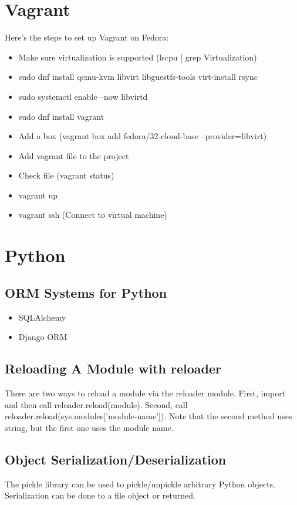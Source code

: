 \documentclass{article}
\begin{document}
\section{Vagrant}

Here's the steps to set up Vagrant on Fedora:
\begin{itemize}
\item Make sure virtualization is supported (lscpu | grep Virtualization)
\item sudo dnf install qemu-kvm libvirt libguestfs-tools virt-install rsync
\item sudo systemctl enable --now libvirtd
\item sudo dnf install vagrant
\item Add a box (vagrant box add fedora/32-cloud-base --provider=libvirt)
\item Add vagrant file to the project
\item Check file (vagrant status)
\item vagrant up
\item vagrant ssh (Connect to virtual machine)

\end{itemize}


\section{Python}
\subsection{ORM Systems for Python}
  \begin{itemize}
  	\item SQLAlchemy
  	\item Django ORM
  \end{itemize}
  
  

\subsection{Reloading A Module with reloader}
There are two ways to reload a module via the reloader module. First, import and then call reloader.reload(module). Second, call reloader.reload(sys.modules['module-name']). Note that the second method uses string, but the first one uses the module name. 


\subsection{Object Serialization/Deserialization}
The pickle library can be used to pickle/unpickle arbitrary Python objects. Serialization can be done to a file object or returned. 
\end{document}
